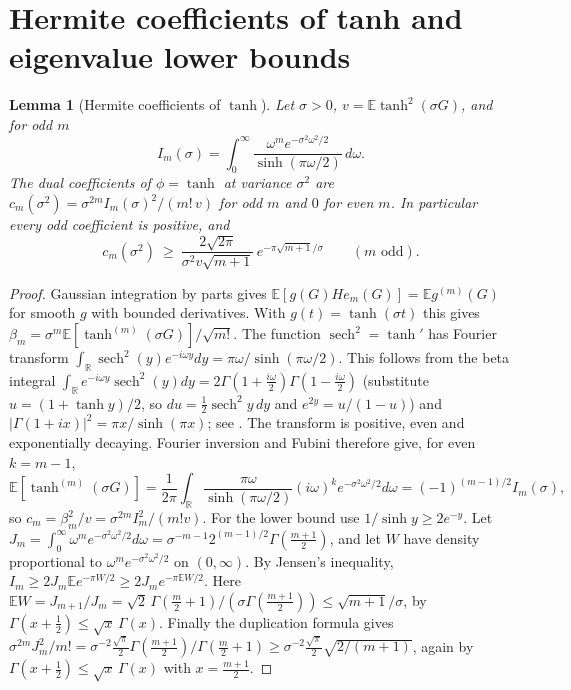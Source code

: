 \documentclass[11pt]{article}
\newtheorem{lemma}[theorem]{Lemma}
\theoremstyle{definition}\newtheorem{assumption}[theorem]{Assumption}
\theoremstyle{remark}\newtheorem{remark}[theorem]{Remark}
\newcommand{\E}{\mathbb E}
\newcommand{\R}{\mathbb R}
\begin{document}
\section{Hermite coefficients of tanh and eigenvalue lower bounds}
\label{sec:tanh}
\begin{lemma}[Hermite coefficients of $\tanh$]\label{lem:tanh}
Let $\sigma>0$, $v=\E\tanh^2(\sigma G)$, and for odd $m$
\[
 I_m(\sigma)=\int_0^\infty\frac{\omega^m e^{-\sigma^2\omega^2/2}}
 {\sinh(\pi\omega/2)}\,d\omega .
\]
The dual coefficients of $\phi=\tanh$ at variance $\sigma^2$ are
$c_m(\sigma^2)=\sigma^{2m}I_m(\sigma)^2/(m!\,v)$ for odd $m$ and $0$ for
even $m$. In particular every odd coefficient is positive, and
\begin{equation}\label{eq:tanhlower}
 c_m(\sigma^2)\ \ge\ \frac{2\sqrt{2\pi}}{\sigma^2v\sqrt{m+1}}\,
 e^{-\pi\sqrt{m+1}/\sigma}\qquad(m\text{ odd}).
\end{equation}
\end{lemma}
\begin{proof}
Gaussian integration by parts gives $\E[g(G)He_m(G)]=\E g^{(m)}(G)$ for
smooth $g$ with bounded derivatives. With $g(t)=\tanh(\sigma t)$ this gives
$\beta_m=\sigma^m\E[\tanh^{(m)}(\sigma G)]/\sqrt{m!}$. The function
$\operatorname{sech}^2=\tanh'$ has Fourier transform
$\int_\R\operatorname{sech}^2(y)e^{-i\omega y}dy=\pi\omega/\sinh(\pi\omega/2)$.
This follows from the beta integral
$\int_\R e^{-i\omega y}\operatorname{sech}^2(y)dy=2\Gamma(1+\frac{i\omega}2)\Gamma(1-\frac{i\omega}2)$
(substitute $u=(1+\tanh y)/2$, so $du=\frac12\operatorname{sech}^2y\,dy$ and $e^{2y}=u/(1-u)$) and $|\Gamma(1+ix)|^2=\pi x/\sinh(\pi x)$; see \cite[Sections~3.98 and~8.33]{GR}. The transform is positive, even and exponentially decaying.
Fourier inversion and Fubini therefore give, for even $k=m-1$,
\[
 \E[\tanh^{(m)}(\sigma G)]
 =\frac1{2\pi}\int_\R\frac{\pi\omega}{\sinh(\pi\omega/2)}(i\omega)^{k}
  e^{-\sigma^2\omega^2/2}d\omega
 =(-1)^{(m-1)/2}I_m(\sigma),
\]
so $c_m=\beta_m^2/v=\sigma^{2m}I_m^2/(m!v)$. For the lower bound use
$1/\sinh y\ge2e^{-y}$. Let $J_m=\int_0^\infty\omega^me^{-\sigma^2\omega^2/2}
d\omega=\sigma^{-m-1}2^{(m-1)/2}\Gamma(\frac{m+1}2)$, and let $W$ have
density proportional to $\omega^me^{-\sigma^2\omega^2/2}$ on $(0,\infty)$.
By Jensen's inequality,
$I_m\ge2J_m\E e^{-\pi W/2}\ge2J_me^{-\pi\E W/2}$. Here
$\E W=J_{m+1}/J_m=\sqrt2\,\Gamma(\frac m2+1)/(\sigma\Gamma(\frac{m+1}2))
\le\sqrt{m+1}/\sigma$, by $\Gamma(x+\frac12)\le\sqrt x\,\Gamma(x)$. Finally
the duplication formula gives
$\sigma^{2m}J_m^2/m!=\sigma^{-2}\frac{\sqrt\pi}2\Gamma(\frac{m+1}2)/
\Gamma(\frac m2+1)\ge\sigma^{-2}\frac{\sqrt\pi}2\sqrt{2/(m+1)}$, again by
$\Gamma(x+\frac12)\le\sqrt x\,\Gamma(x)$ with $x=\frac{m+1}2$.
\end{proof}
\end{document}
